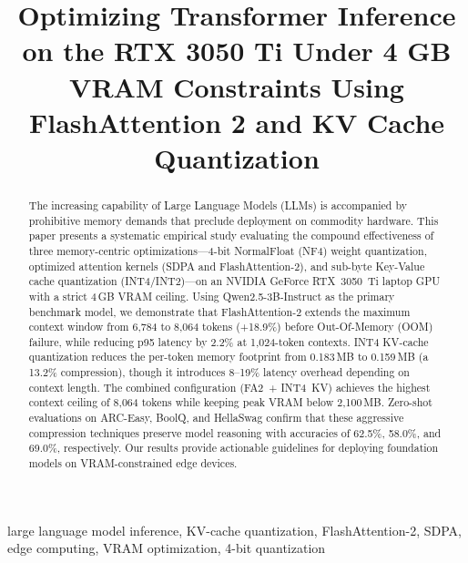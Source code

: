 \documentclass[conference]{IEEEtran}
\begin{document}
\title{Optimizing Transformer Inference on the RTX 3050 Ti Under 4 GB VRAM Constraints Using FlashAttention 2 and KV Cache Quantization}

\author{
\and
{}
}

\maketitle

\begin{abstract}
The increasing capability of Large Language Models (LLMs) is accompanied by prohibitive memory demands that preclude deployment on commodity hardware. This paper presents a systematic empirical study evaluating the compound effectiveness of three memory-centric optimizations---4-bit NormalFloat (NF4) weight quantization, optimized attention kernels (SDPA and FlashAttention-2), and sub-byte Key-Value cache quantization (INT4/INT2)---on an NVIDIA GeForce RTX~3050~Ti laptop GPU with a strict 4\,GB VRAM ceiling. Using Qwen2.5-3B-Instruct as the primary benchmark model, we demonstrate that FlashAttention-2 extends the maximum context window from 6{,}784 to 8{,}064 tokens (+18.9\%) before Out-Of-Memory (OOM) failure, while reducing p95 latency by 2.2\% at 1{,}024-token contexts. INT4 KV-cache quantization reduces the per-token memory footprint from 0.183\,MB to 0.159\,MB (a 13.2\% compression), though it introduces 8--19\% latency overhead depending on context length. The combined configuration (FA2~+ INT4~KV) achieves the highest context ceiling of 8{,}064 tokens while keeping peak VRAM below 2{,}100\,MB. Zero-shot evaluations on ARC-Easy, BoolQ, and HellaSwag confirm that these aggressive compression techniques preserve model reasoning with accuracies of 62.5\%, 58.0\%, and 69.0\%, respectively. Our results provide actionable guidelines for deploying foundation models on VRAM-constrained edge devices.
\end{abstract}

\begin{IEEEkeywords}
large language model inference, KV-cache quantization, FlashAttention-2, SDPA, edge computing, VRAM optimization, 4-bit quantization
\end{IEEEkeywords}
\end{document}
